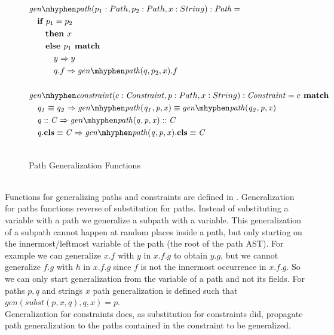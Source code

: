 \begin{figure}[t]
\centering
\begin{align*}
&\genp(p_1: Path, p_2: Path, x: String):\mIt{Path} = \\
&\quad\If p_1 = p_2\\
&\qquad \Then x\\
&\qquad \Else p_1 \match\\
&\qquad\quad y \Rightarrow y\\
&\qquad\quad q.f \Rightarrow \genp(q, p_2, x).f\\
\\
&\genc(c: \Constr, p: Path, x: String): \Constr = c \match\\
&\quad \case{\pathEq{q_1}{q_2}}
  {\pathEq
    {\genp(q_1, p, x)}
    {\genp(q_2, p, x)}}\\
&\quad \case{\instOf{q}{C}}
  {\instOf{\genp(q, p, x)}{C}}\\
&\quad \case{\instBy{q}{C}}
  {\instBy{\genp(q, p, x)}{C}}\\\\
\end{align*}
\caption{Path Generalization Functions}
\label{fig:axioms-general-gen}
\end{figure}\\
Functions for generalizing paths and constraints are defined in .
Generalization for paths functions reverse of substitution for paths.
Instead of substituting a variable with a path we generalize a subpath with a variable.
This generalization of a subpath cannot happen at random places inside a path,
but only starting on the innermost/leftmost variable of the path (the root of the path AST).
For example we can generalize $x.f$ with $y$ in $x.f.g$ to obtain $y.g$,
but we cannot generalize $f.g$ with $h$ in $x.f.g$
since $f$ is not the innermost occurrence in $x.f.g$.
So we can only start generalization from the variable of a path and not its fields.
For paths $p, q$ and strings $x$ path generalization is defined
such that $gen(subst(p, x, q), q, x) = p$.\\
Generalization for constraints does,
as substitution for constraints did,
propagate path generalization to the paths contained in the constraint
to be generalized.

